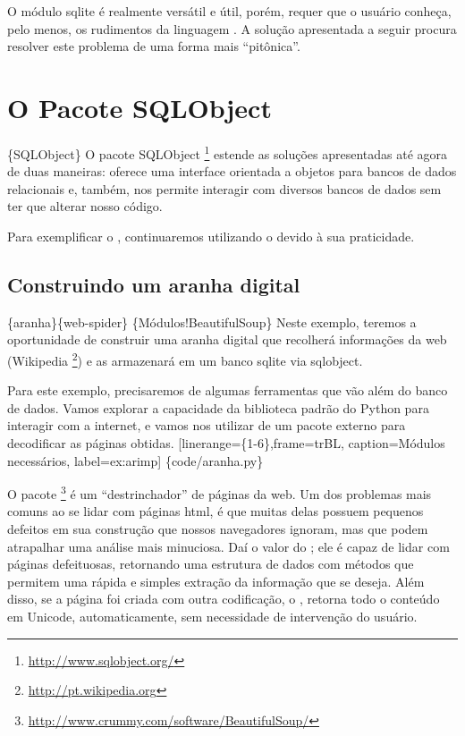 \documentclass[a4paper,10pt,portuguese]{sphinxmanual}
\begin{document}
O módulo sqlite é realmente versátil e útil, porém, requer que o
usuário conheça, pelo menos, os rudimentos da linguagem . A
solução apresentada a seguir procura resolver este problema de uma
forma mais ``pitônica''.


\chapter{O Pacote SQLObject}
\label{capbd:o-pacote-sqlobject}
\{SQLObject\} O pacote SQLObject \footnote{
\href{http://www.sqlobject.org/}{http://www.sqlobject.org/}
} estende as soluções
apresentadas até agora de duas maneiras: oferece uma interface
orientada a objetos para bancos de dados relacionais e, também, nos
permite interagir com diversos bancos de dados sem ter que alterar
nosso código.

Para exemplificar o , continuaremos utilizando o
 devido à sua praticidade.


\section{Construindo um aranha digital}
\label{capbd:construindo-um-aranha-digital}
\{aranha\}\{web-spider\} \{Módulos!BeautifulSoup\} Neste exemplo, teremos
a oportunidade de construir uma aranha digital que recolherá
informações da web (Wikipedia \footnote{
\href{http://pt.wikipedia.org}{http://pt.wikipedia.org}
}) e as armazenará em um banco
sqlite via sqlobject.

Para este exemplo, precisaremos de algumas ferramentas que vão além
do banco de dados. Vamos explorar a capacidade da biblioteca padrão
do Python para interagir com a internet, e vamos nos utilizar de um
pacote externo para decodificar as páginas obtidas.
{[}linerange=\{1-6\},frame=trBL, caption=Módulos necessários, label=ex:arimp{]} \{code/aranha.py\}

O pacote  \footnote{
\href{http://www.crummy.com/software/BeautifulSoup/}{http://www.crummy.com/software/BeautifulSoup/}
} é um ``destrinchador'' de páginas da
web. Um dos problemas mais comuns ao se lidar com páginas html, é
que muitas delas possuem pequenos defeitos em sua construção que
nossos navegadores ignoram, mas que podem atrapalhar uma análise
mais minuciosa. Daí o valor do ; ele é capaz de
lidar com páginas defeituosas, retornando uma estrutura de dados
com métodos que permitem uma rápida e simples extração da
informação que se deseja. Além disso, se a página foi criada com
outra codificação, o , retorna todo o conteúdo em
Unicode, automaticamente, sem necessidade de intervenção do
usuário.
\end{document}
